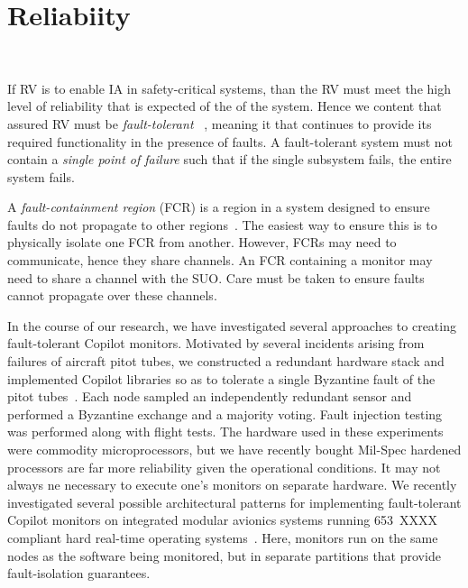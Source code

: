 \section{Reliabiity}~\label{sec:ft}

\noindent{}
 
If RV is to enable IA in safety-critical systems, than the RV must
meet the high level of reliability that is expected of the of the
system. Hence we content that assured RV must be \emph{fault-tolerant}
~\cite{butler-faults}, meaning it that continues to provide its
required functionality in the presence of faults.  A fault-tolerant
system must not contain a \emph{single point of failure} such that if
the single subsystem fails, the entire system fails. 




A \emph{fault-containment region} (FCR) is a region in a system
designed to ensure faults do not propagate to other
regions~\cite{Rushby01:buscompare}.  The easiest way to ensure this is
to physically isolate one FCR from another.  However, FCRs may
need to communicate, hence  they share channels. An FCR
containing a monitor may need to share a channel with the SUO.  Care must be taken to
ensure faults cannot propagate over these channels.  

In the course of our research, we have investigated several approaches
to creating fault-tolerant Copilot monitors.  Motivated by several
incidents arising from failures of aircraft pitot tubes, we
constructed a redundant hardware stack and implemented Copilot
libraries so as to tolerate a single Byzantine fault of the pitot
tubes~\cite{pike-isse-13}. Each node sampled an independently
redundant sensor and performed a Byzantine exchange and a majority
voting.  Fault injection testing was performed along with flight
tests.  The hardware used in these experiments were commodity
microprocessors, but we have recently bought Mil-Spec hardened
processors are far more reliability given the operational conditions.
It may not always ne necessary to execute one's monitors on separate
hardware. We recently investigated several possible architectural
patterns for implementing fault-tolerant Copilot monitors on
integrated modular avionics systems running 653~{XXXX} compliant hard
real-time operating systems~\cite{Kaveh15}. Here, monitors run on the
same nodes as the software being monitored, but 
in separate partitions that provide fault-isolation guarantees.








